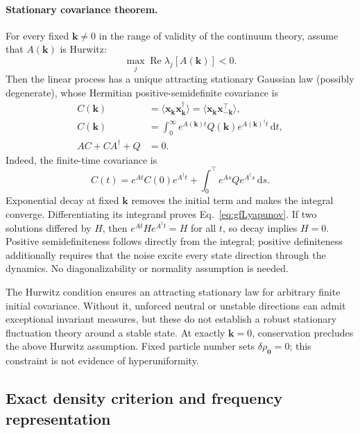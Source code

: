 \documentclass{article}
\begin{document}
\paragraph{Stationary covariance theorem.}
For every fixed $\mathbf k\ne0$ in the range of validity of the continuum theory, assume that $A(\mathbf k)$ is Hurwitz:
\begin{equation}
    \max_j\operatorname{Re}\lambda_j[A(\mathbf k)]<0.
    \label{eq:gfHurwitz}
\end{equation}
Then the linear process has a unique attracting stationary Gaussian law (possibly degenerate), whose Hermitian positive-semidefinite covariance is
\begin{align}
    C(\mathbf k)&=\langle\mathbf x_{\mathbf k}\mathbf x_{\mathbf k}^\dagger\rangle
    =\langle\mathbf x_{\mathbf k}\mathbf x_{-\mathbf k}^{\top}\rangle,\\
    C(\mathbf k)&=\int_0^\infty e^{A(\mathbf k)t}Q(\mathbf k)
    e^{A(\mathbf k)^\dagger t}\,\mathrm dt,
    \label{eq:gfGramian}\\
    AC+CA^\dagger+Q&=0.
    \label{eq:gfLyapunov}
\end{align}
Indeed, the finite-time covariance is
\begin{equation}
    C(t)=e^{At}C(0)e^{A^\dagger t}
    +\int_0^{\top} e^{As}Qe^{A^\dagger s}\,\mathrm ds.
\end{equation}
Exponential decay at fixed $\mathbf k$ removes the initial term and makes the integral converge. Differentiating its integrand proves Eq.~\eqref{eq:gfLyapunov}. If two solutions differed by $H$, then $e^{At}He^{A^\dagger t}=H$ for all $t$, so decay implies $H=0$. Positive semidefiniteness follows directly from the integral; positive definiteness additionally requires that the noise excite every state direction through the dynamics. No diagonalizability or normality assumption is needed.

The Hurwitz condition ensures an attracting stationary law for arbitrary finite initial covariance. Without it, unforced neutral or unstable directions can admit exceptional invariant measures, but these do not establish a robust stationary fluctuation theory around a stable state. At exactly $\mathbf k=0$, conservation precludes the above Hurwitz assumption. Fixed particle number sets $\delta\rho_{\mathbf0}=0$; this constraint is not evidence of hyperuniformity.

\subsection{Exact density criterion and frequency representation}
\end{document}
